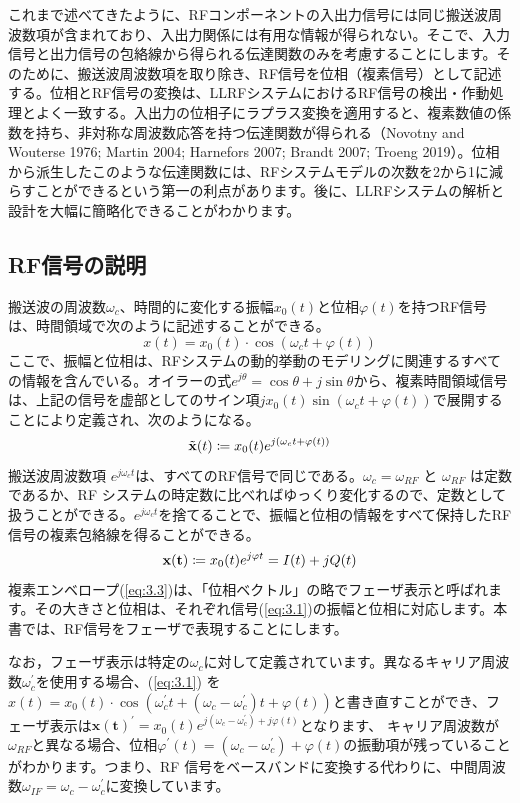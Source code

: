\documentclass[book]{jlreq}
\begin{document}
これまで述べてきたように、RFコンポーネントの入出力信号には同じ搬送波周波数項が含まれており、入出力関係には有用な情報が得られない。そこで、入力信号と出力信号の包絡線から得られる伝達関数のみを考慮することにします。そのために、搬送波周波数項を取り除き、RF信号を位相（複素信号）として記述する。位相とRF信号の変換は、LLRFシステムにおけるRF信号の検出・作動処理とよく一致する。入出力の位相子にラプラス変換を適用すると、複素数値の係数を持ち、非対称な周波数応答を持つ伝達関数が得られる（Novotny and Wouterse 1976\cite{Novotny}; Martin 2004; Harnefors 2007; Brandt 2007; Troeng 2019）。位相から派生したこのような伝達関数には、RFシステムモデルの次数を2から1に減らすことができるという第一の利点があります。後に、LLRFシステムの解析と設計を大幅に簡略化できることがわかります。

\subsection{RF信号の説明}

搬送波の周波数$\omega_c$、時間的に変化する振幅$x_0(t)$と位相$\varphi(t)$を持つRF信号は、時間領域で次のように記述することができる。
%
\begin{equation}
    x(t) = x_0(t) \cdot \cos(\omega_c t + \varphi (t))
    \label{eq:3.1}
\end{equation}
%
ここで、振幅と位相は、RFシステムの動的挙動のモデリングに関連するすべての情報を含んでいる。オイラーの式$e^{j\theta} = \cos\theta + j \sin\theta$から、複素時間領域信号は、上記の信号を虚部としてのサイン項$j x_0(t) \sin (\omega_c t + \varphi (t))$で展開することにより定義され、次のようになる。
%
\begin{equation}
    \tilde{\vb{x}}(t) \coloneqq x_0(t) e^{j(\omega_c t+\varphi(t))}
    \label{eq:3.2}
\end{equation}
%
搬送波周波数項 $e^{j\omega_c t}$は、すべてのRF信号で同じである。$\omega_c = \omega_{RF}$ と $\omega_{RF}$ は定数であるか、RF システムの時定数に比べればゆっくり変化するので、定数として扱うことができる。$e^{j\omega_c t}$を捨てることで、振幅と位相の情報をすべて保持したRF信号の複素包絡線を得ることができる。
%
\begin{equation}
    \vb{x(t)} \coloneqq x_0(t) e^{j\varphi t} = I(t) + j Q(t)
    \label{eq:3.3} 
\end{equation}
%
複素エンベロープ(\ref{eq:3.3})は、「位相ベクトル」の略でフェーザ表示と呼ばれます。その大きさと位相は、それぞれ信号(\ref{eq:3.1})の振幅と位相に対応します。本書では、RF信号をフェーザで表現することにします。

なお，フェーザ表示は特定の$\omega_c$に対して定義されています。異なるキャリア周波数$\omega_c^{\prime}$を使用する場合、(\ref{eq:3.1}) を $x(t) = x_0(t)\cdot \cos(\omega_c^{\prime} t + (\omega_c - \omega_c^{\prime}) t + \varphi (t))$と書き直すことができ、フェーザ表示は$\bm{x(t)}^{\prime} = x_0(t) e^{j (\omega_c - \omega_c^{\prime}) + j \varphi (t)}$となります、
キャリア周波数が$\omega_{RF}$と異なる場合、位相$\varphi^{\prime} (t) = (\omega_c - \omega_c^{\prime}) + \varphi (t)$の振動項が残っていることがわかります。つまり、RF 信号をベースバンドに変換する代わりに、中間周波数$\omega_{IF} = \omega_c - \omega_c^{\prime}$に変換しています。
\end{document}
